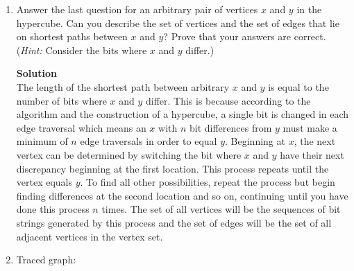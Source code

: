 \documentclass[11pt]{article}
\newenvironment{Parts}{\begin{enumerate}[label=(\alph*)]}{\end{enumerate}}
\newcommand*{\Part}{\item}
\newenvironment{Answer}{\vspace{10pt}\begin{mdframed}\textbf{Solution}\\}{\end{mdframed}\vfill\pagebreak[3]}
\newenvironment{Answer}{\vspace{10pt}}{\vfill\pagebreak[3]}
\begin{document}
\begin{Parts}
 \begin{Answer}
 The length of the shortest path between $x$ and $y$ is 2. $V_{x,y}=\{110, 111, 011\}$ and $E_{x,y}=\{(110,111),(111,011)\}$ or $V_{x,y}=\{110, 010, 011\}$ and $E_{x,y}=\{(110,010),(010,011)\}$ .
 \end{Answer}

 \Part Answer the last question for an arbitrary pair of vertices $x$ and $y$ in
 the hypercube. Can you describe the set of vertices and the set of edges that
 lie on shortest paths between $x$ and $y$? Prove that your answers are
 correct. ({\em Hint:} Consider the bits where $x$ and $y$ differ.)

 \begin{Answer}
 The length of the shortest path between arbitrary $x$ and $y$ is equal to the number of bits where $x$ and $y$ differ. This is because according to the algorithm and the construction of a hypercube, a single bit is changed in each edge traversal which means an $x$ with $n$  bit differences from $y$ must make a minimum of $n$ edge traversals in order to equal $y$. Beginning at $x$, the next vertex can be determined by switching the bit where $x$ and $y$ have their next discrepancy beginning at the first location. This process repeats until the vertex equals $y$. To find all other possibilities, repeat the process but begin finding differences at the second location and so on, continuing until you have done this process $n$ times. The set of all vertices will be the sequences of bit strings generated by this process and the set of edges will be the set of all adjacent vertices in the vertex set.  
 \end{Answer}

 \Part Traced graph:



\end{Parts}
\end{document}
